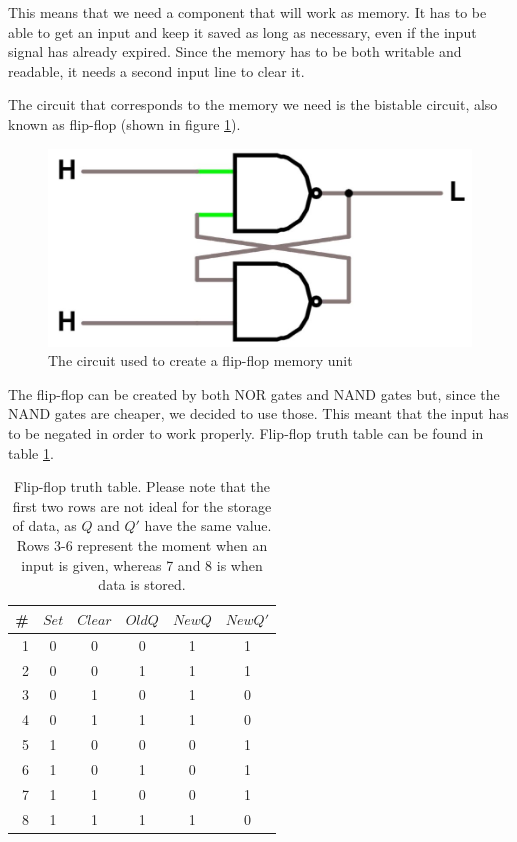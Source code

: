\documentclass{article}
\begin{document}
This means that we need a component that will work as memory. It has to be able to get an input and keep it saved as long as necessary, even if the input signal has already expired. Since the memory has to be both writable and readable, it needs a second input line to clear it.

\vspace{3mm}

The circuit that corresponds to the memory we need is the bistable circuit, also known as flip-flop (shown in figure \ref{FlipFlop}).

\begin{figure}[h]
    \centering
    \includegraphics[scale=.3]{IM_FlipFlop}
    \caption{The circuit used to create a flip-flop memory unit}
    \label{FlipFlop}   
\end{figure}

The flip-flop can be created by both NOR gates and NAND gates but, since the NAND gates are cheaper, we decided to use those. This meant that the input has to be negated in order to work properly. Flip-flop truth table can be found in table \ref{FlipFlopTT}.


\begin{table}[h]
\centering
\begin{tabular}{ | c | c  c  c | c  c |}
\hline
 \# & $Set$ & $Clear$ & $Old Q$ & $New Q$ & $New Q'$\\
\hline
 \ 1 & 0 & 0 & 0 & 1 & 1 \\ 
 \ 2 & 0 & 0 & 1 & 1 & 1 \\
\hline 
 \ 3 & 0 & 1 & 0 & 1 & 0 \\ 
 \ 4 & 0 & 1 & 1 & 1 & 0 \\ 
 \ 5 & 1 & 0 & 0 & 0 & 1 \\
 \ 6 & 1 & 0 & 1 & 0 & 1 \\
\hline
 \ 7 & 1 & 1 & 0 & 0 & 1 \\
 \ 8 & 1 & 1 & 1 & 1 & 0 \\ 
\hline
\end{tabular}
\caption{Flip-flop truth table. Please note that the first two rows are not ideal for the storage of data, as $Q$ and $Q'$ have the same value. Rows 3-6 represent the moment when an input is given, whereas 7 and 8 is when data is stored.}
\label{FlipFlopTT}
\end{table}
\end{document}
